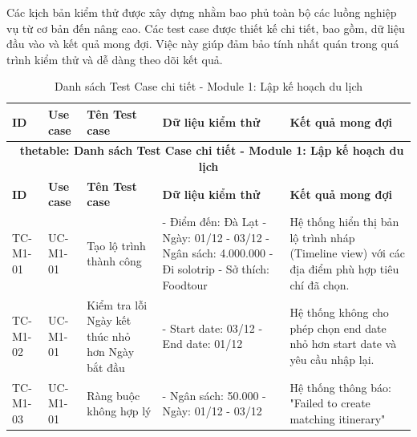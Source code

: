 Các kịch bản kiểm thử được xây dựng nhằm bao phủ toàn bộ các luồng nghiệp vụ từ cơ bản đến nâng cao.
Các test case được thiết kế chi tiết, bao gồm, dữ liệu đầu vào và kết quả mong đợi. Việc này giúp đảm bảo tính nhất quán trong quá trình kiểm thử và dễ dàng theo dõi kết quả.
% 
\hypertarget{target:tc_m1}{}
\begin{landscape}
\small 
\begin{longtable}{|p{2.2cm}|p{2.2cm}|p{4cm}|p{4.5cm}|p{6cm}|}
    
\caption{Danh sách Test Case chi tiết - Module 1: Lập kế hoạch du lịch} \label{tab:tc_module1-result} \\
\hline
\textbf{ID} & \textbf{ Use case} & \textbf{Tên Test case} & \textbf{Dữ liệu kiểm thử} & \textbf{Kết quả mong đợi}  \\
\hline
\endfirsthead

\multicolumn{5}{c}{{\bfseries \tablename\ thetable{}: Danh sách Test Case chi tiết - Module 1: Lập kế hoạch du lịch}} \\
\hline
\textbf{ID} & \textbf{ Use case} & \textbf{Tên Test case} & \textbf{Dữ liệu kiểm thử} & \textbf{Kết quả mong đợi}  \\
\hline
\endhead

\hline
\endlastfoot


TC-M1-01 & UC-M1-01 & Tạo lộ trình thành công & 
- Điểm đến: Đà Lạt \newline 
- Ngày: 01/12 - 03/12 \newline 
- Ngân sách: 4.000.000 \newline 
- Đi solotrip \newline
- Sở thích: Foodtour & 
Hệ thống hiển thị bản lộ trình nháp (Timeline view) với các địa điểm phù hợp tiêu chí đã chọn. \\
\hline

TC-M1-02 & UC-M1-01 & Kiểm tra lỗi Ngày kết thúc nhỏ hơn Ngày bắt đầu & 
- Start date: 03/12 \newline
- End date: 01/12 & 
Hệ thống không cho phép chọn end date nhỏ hơn start date và yêu cầu nhập lại.  \\
\hline

TC-M1-03 & UC-M1-01 & Ràng buộc không hợp lý & 
- Ngân sách: 50.000 \newline
- Ngày: 01/12 - 03/12 & 
Hệ thống thông báo: "Failed to create matching itinerary" \\
\hline


\end{longtable}
\end{landscape}
